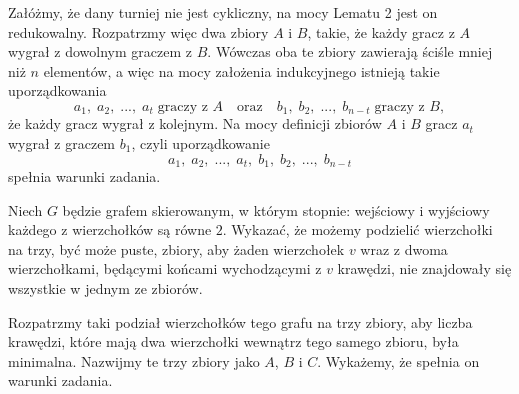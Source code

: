 \vspace{10px}
\noindent
Załóżmy, że dany turniej nie jest cykliczny, na mocy Lematu 2 jest on redukowalny. Rozpatrzmy więc dwa zbiory $A$ i $B$, takie, że każdy gracz z $A$ wygrał z dowolnym graczem z $B$. Wówczas oba te zbiory zawierają ściśle mniej niż $n$ elementów, a więc na mocy założenia indukcyjnego istnieją takie uporządkowania
\[
	a_1, \; a_2, \; ..., \; a_t \; \text{graczy z } A 
	\quad
	\text{oraz}
	\quad
	b_1, \; b_2, \; ..., \; b_{n - t} \; \text{graczy z } B, 
\]
że każdy gracz wygrał z kolejnym. Na mocy definicji zbiorów $A$ i $B$ gracz $a_t$ wygrał z graczem $b_1$, czyli uporządkowanie
\[
	a_1, \; a_2, \; ..., \; a_t , \; b_1, \; b_2, \; ..., \; b_{n - t}
\]
spełnia warunki zadania.

\begin{problem}{3}
	Niech $G$ będzie grafem skierowanym, w którym stopnie: wejściowy i wyjściowy każdego z wierzchołków są równe $2$. Wykazać, że możemy podzielić wierzchołki na trzy, być może puste, zbiory, aby żaden wierzchołek $v$ wraz z dwoma wierzchołkami, będącymi końcami wychodzącymi z $v$ krawędzi, nie znajdowały się wszystkie w jednym ze zbiorów.
\end{problem}

\noindent
Rozpatrzmy taki podział wierzchołków tego grafu na trzy zbiory, aby liczba krawędzi, które mają dwa wierzchołki wewnątrz tego samego zbioru, była minimalna. Nazwijmy te trzy zbiory jako $A$, $B$ i $C$. Wykażemy, że spełnia on warunki zadania.

\begin{center}
\end{center}

